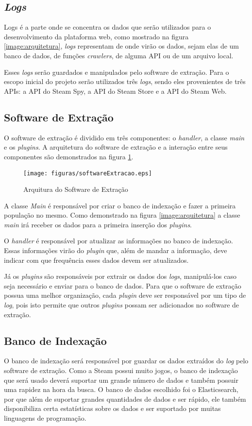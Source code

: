 \subsection{\textit{Logs}}
Logs é a parte onde se concentra os dados que serão utilizados para o desenvolvimento da plataforma web, como mostrado na figura \ref{image:arquitetura}, \textit{logs} representam de onde virão os dados, sejam elas de um banco de dados, de funções \textit{crawlers}, de alguma API ou de um arquivo local.

Esses \textit{logs} serão guardados e manipulados pelo software de extração. Para o escopo inicial do projeto serão utilizados três \textit{logs}, sendo eles provenientes de três APIs: a API do Steam Spy, a API do Steam Store e a API do Steam Web.
\subsection{Software de Extração}
O software de extração é dividido em três componentes: o \textit{handler}, a classe \textit{main} e os \textit{plugins}. A arquitetura do software de extração e a interação entre seus componentes são demonstrados na figura \ref{image:extracao}.
\begin{figure}
\centering
\texttt{[image: figuras/softwareExtracao.eps]}
\caption{Arquitura do Software de Extração}
\label{image:extracao}
\end{figure}
A classe \textit{Main} é responsável por criar o banco de indexação e fazer a primeira população no mesmo. Como demonstrado na figura \ref{image:arquitetura} a classe \textit{main} irá receber os dados para a primeira inserção dos \textit{plugins}.

O \textit{handler} é responsável por atualizar as informações no banco de indexação. Essas informações virão do \textit{plugin} que, além de mandar a informação, deve indicar com que frequência esses dados devem ser atualizados.

Já os \textit{plugins} são responsáveis por extrair os dados dos \textit{logs}, manipulá-los caso seja necessário e enviar para o banco de dados. Para que o software de extração possua uma melhor organização, cada \textit{plugin} deve ser responsável por um tipo de \textit{log}, pois isto permite que outros \textit{plugins} possam ser adicionados no software de extração.
\subsection{Banco de Indexação}
O banco de indexação será responsável por guardar os dados extraídos do \textit{log} pelo software de extração. Como a Steam possui muito jogos, o banco de indexação que será usado deverá suportar um grande número de dados e também possuir uma rapidez na hora da busca. O banco de dados escolhido foi o Elasticsearch, por que além de suportar grandes quantidades de dados e ser rápido, ele também disponibiliza certa estatísticas sobre os dados e ser suportado por muitas linguagens de programação.
